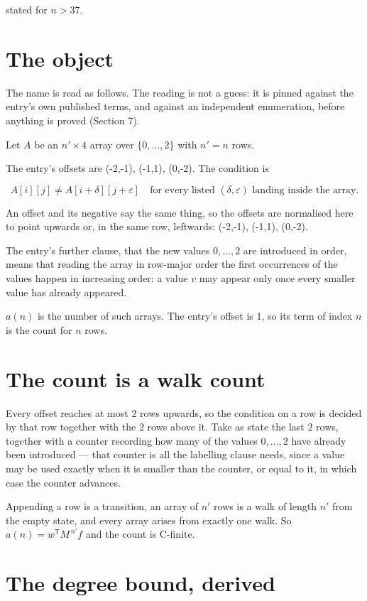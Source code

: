 \documentclass[11pt]{article}
\theoremstyle{definition}
\begin{document}
stated for $n > 37$.

\section{The object}

The name is read as follows. The reading is not a guess: it is pinned against the entry's own published terms, and against an independent enumeration, before anything is proved (Section 7).

Let $A$ be an $n' \times 4$ array over $\{0,\dots,2\}$ with $n' = n$ rows.

The entry's offsets are (-2,-1), (-1,1), (0,-2). The condition is

\[A[i][j] \ne A[i{+}\delta][j{+}\varepsilon]\quad\text{for every listed }(\delta,\varepsilon)\text{ landing inside the array.}\]

An offset and its negative say the same thing, so the offsets are normalised here to point upwards or, in the same row, leftwards: (-2,-1), (-1,1), (0,-2).

The entry's further clause, that the new values $0,\dots,2$ are introduced in order, means that reading the array in row-major order the first occurrences of the values happen in increasing order: a value $v$ may appear only once every smaller value has already appeared.

$a(n)$ is the number of such arrays. The entry's offset is 1, so its term of index $n$ is the count for $n$ rows.

\section{The count is a walk count}

Every offset reaches at most $2$ rows upwards, so the condition on a row is decided by that row together with the $2$ rows above it. Take as state the last $2$ rows, together with a counter recording how many of the values $0,\dots,2$ have already been introduced --- that counter is all the labelling clause needs, since a value may be used exactly when it is smaller than the counter, or equal to it, in which case the counter advances.

Appending a row is a transition, an array of $n'$ rows is a walk of length $n'$ from the empty state, and every array arises from exactly one walk. So $a(n) = w^{\mathsf T}M^{\,n'}f$ and the count is C-finite.

\section{The degree bound, derived}
\end{document}
